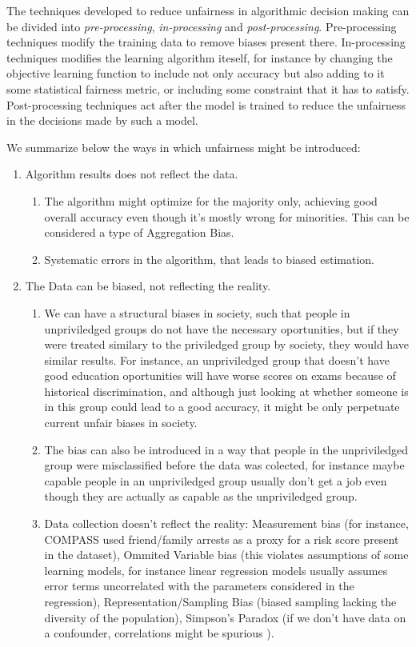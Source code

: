 The techniques developed to reduce unfairness in algorithmic decision making can be divided into \emph{pre-processing}, \emph{in-processing} and \emph{post-processing}. Pre-processing techniques modify the training data to remove biases present there. In-processing techniques modifies the learning algorithm iteself, for instance by changing the objective learning function to include not only accuracy but also adding to it some statistical fairness metric, or including some constraint that it has to satisfy. Post-processing techniques act after the model is trained to reduce the unfairness in the decisions made by such a model.

We summarize below the ways in which unfairness might be introduced:

\begin{enumerate}
\item Algorithm results does not reflect the data.
    \begin{enumerate}
    \item The algorithm might optimize for the majority only, achieving good overall accuracy even though it's mostly wrong for minorities. This can be considered a type of Aggregation Bias.
    \item Systematic errors in the algorithm, that leads to biased estimation.
    \end{enumerate}
\item The Data can be biased, not reflecting the reality.
    \begin{enumerate}
    \item We can have a structural biases in society, such that people in unpriviledged groups do not have the necessary oportunities, but if they were treated similary to the priviledged group by society, they would have similar results. For instance, an unpriviledged group that doesn't have good education oportunities will have worse scores on exams because of historical discrimination, and although just looking at whether someone is in this group could lead to a good accuracy, it might be only perpetuate current unfair biases in society.
    \item The bias can also be introduced in a way that people in the unpriviledged group were misclassified before the data was colected, for instance maybe capable people in an unpriviledged group usually don't get a job even though they are actually as capable as the unpriviledged group.
    \item Data collection doesn't reflect the reality: Measurement bias (for instance, COMPASS used friend/family arrests as a proxy for a risk score present in the dataset), Ommited Variable bias (this violates assumptions of some learning models, for instance linear regression models usually assumes error terms uncorrelated with the parameters considered in the regression), Representation/Sampling Bias (biased sampling lacking the diversity of the population), Simpson's Paradox (if we don't have data on a confounder, correlations might be spurious \cite{Causality}).

\end{enumerate}
\end{enumerate}
